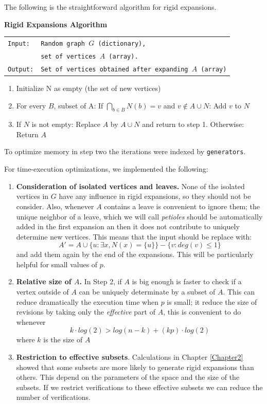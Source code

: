 The following is the straightforward algorithm for rigid expansions.

\begin{cajita}
\textbf{Rigid Expansions Algorithm} \hfill \break

\begin{tabular}{ l l }
\texttt{Input:} &  \texttt{Random graph $G$ (dictionary),} \\
                &  \texttt{set of vertices $A$ (array).}\\
\texttt{Output:} & \texttt{Set of vertices obtained after expanding $A$ (array)} \\
\end{tabular}
\begin{enumerate}
\item Initialize N as empty (the set of new vertices)
\item For every $B$, subset of A:\hfill \break
\hphantom{12} If $\bigcap\limits_{b\in B} N(b) = v$ and $v\not\in A\cup N$: \hfill \break
\hphantom{1234} Add $v$ to $N$
\item If $N$ is not empty: \hfill \break
\hphantom{12} Replace $A$ by $A\cup N$ and return to step 1. \hfill \break
      Otherwise:\hfill \break
\hphantom{12} Return $A$
\end{enumerate}
\end{cajita}

To optimize memory in step two the iterations were indexed by \texttt{generators}.

For time-execution optimizations, we implemented the following:

\begin{enumerate}
\item \textbf{Consideration of isolated vertices and leaves.} None of the isolated vertices in $G$ have any influence in rigid expansions, so they should not be consider. Also, whenever $A$ contains a leave is convenient to ignore them; the unique neighbor of a leave, which we will call \textit{petioles} should be automatically added in the first expansion an then it does not contribute to uniquely determine new vertices. This means that the input should be replace with:
$$A' = A \cup \{u: \exists x, N(x)=\{u\}\} - \{v: deg(v)\leq 1 \}  $$
and add them again by the end of the expansions. This will be particularly helpful for small values of $p$.
\item \textbf{Relative size of $A$.} In Step 2, if $A$ is big enough is faster to check if a vertex outside of $A$ can be uniquely determinate by a subset of $A$. This can reduce dramatically the execution time when $p$ is small; it reduce the size of revisions by taking only the \textit{effective} part of $A$, this is convenient to do whenever
$$k\cdot log(2) > log(n-k) + (kp)\cdot log(2)$$
where $k$ is the size of $A$

\item \textbf{Restriction to effective subsets}. Calculations in Chapter \ref{Chapter2} showed that some subsets are more likely to generate rigid expansions than others. This depend on the parameters of the space and the size of the subsets. If we restrict verifications to these effective subsets we can reduce the number of verifications.
\end{enumerate}

